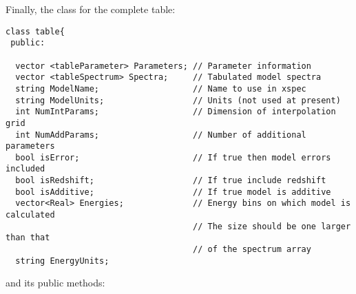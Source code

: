 \documentclass[11pt]{book}
\begin{document}
Finally, the class for the complete table:

\begin{verbatim}
class table{
 public:

  vector <tableParameter> Parameters; // Parameter information
  vector <tableSpectrum> Spectra;     // Tabulated model spectra
  string ModelName;                   // Name to use in xspec
  string ModelUnits;                  // Units (not used at present)
  int NumIntParams;                   // Dimension of interpolation grid
  int NumAddParams;                   // Number of additional parameters
  bool isError;                       // If true then model errors included
  bool isRedshift;                    // If true include redshift
  bool isAdditive;                    // If true model is additive
  vector<Real> Energies;              // Energy bins on which model is calculated
                                      // The size should be one larger than that
                                      // of the spectrum array
  string EnergyUnits;
\end{verbatim}

and its public methods:
\end{document}

